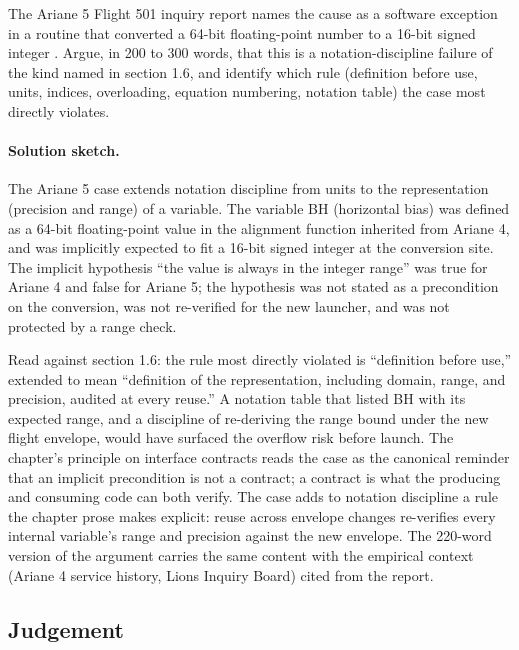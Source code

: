 \begin{exercise}
The Ariane 5 Flight 501 inquiry report names the cause as a software
exception in a routine that converted a 64-bit floating-point number
to a 16-bit signed integer \cite{acc:ariane501-ifr}. Argue, in 200
to 300 words, that this is a notation-discipline failure of the
kind named in section 1.6, and identify which rule (definition
before use, units, indices, overloading, equation numbering,
notation table) the case most directly violates.

\paragraph{Solution sketch.}
The Ariane 5 case extends notation discipline from units to the
representation (precision and range) of a variable. The variable
BH (horizontal bias) was defined as a 64-bit floating-point value in
the alignment function inherited from Ariane 4, and was implicitly
expected to fit a 16-bit signed integer at the conversion site.
The implicit hypothesis ``the value is always in the integer
range'' was true for Ariane 4 and false for Ariane 5; the
hypothesis was not stated as a precondition on the conversion, was
not re-verified for the new launcher, and was not protected by a
range check.

Read against section 1.6: the rule most directly violated is
``definition before use,'' extended to mean ``definition of the
representation, including domain, range, and precision, audited at
every reuse.'' A notation table that listed BH with its expected
range, and a discipline of re-deriving the range bound under the
new flight envelope, would have surfaced the overflow risk before
launch. The chapter's principle on interface contracts reads the
case as the canonical reminder that an implicit precondition is
not a contract; a contract is what the producing and consuming
code can both verify. The case adds to notation discipline a rule
the chapter prose makes explicit: reuse across envelope changes
re-verifies every internal variable's range and precision against
the new envelope. The 220-word version of the argument carries the
same content with the empirical context (Ariane 4 service history,
Lions Inquiry Board) cited from the report.
\end{exercise}

\subsection*{Judgement}

